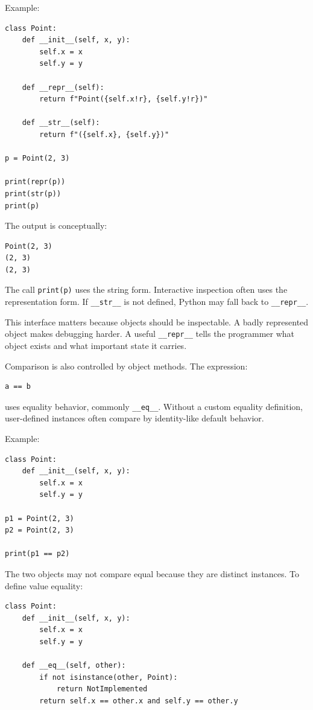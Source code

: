 Example:

\begin{verbatim}
class Point:
    def __init__(self, x, y):
        self.x = x
        self.y = y

    def __repr__(self):
        return f"Point({self.x!r}, {self.y!r})"

    def __str__(self):
        return f"({self.x}, {self.y})"

p = Point(2, 3)

print(repr(p))
print(str(p))
print(p)
\end{verbatim}

The output is conceptually:

\begin{verbatim}
Point(2, 3)
(2, 3)
(2, 3)
\end{verbatim}

The call \texttt{print(p)} uses the string form. Interactive inspection often uses the representation form. If \texttt{\_\_str\_\_} is not defined, Python may fall back to \texttt{\_\_repr\_\_}.

This interface matters because objects should be inspectable. A badly represented object makes debugging harder. A useful \texttt{\_\_repr\_\_} tells the programmer what object exists and what important state it carries.

Comparison is also controlled by object methods. The expression:

\begin{verbatim}
a == b
\end{verbatim}

uses equality behavior, commonly \texttt{\_\_eq\_\_}. Without a custom equality definition, user-defined instances often compare by identity-like default behavior.

Example:

\begin{verbatim}
class Point:
    def __init__(self, x, y):
        self.x = x
        self.y = y

p1 = Point(2, 3)
p2 = Point(2, 3)

print(p1 == p2)
\end{verbatim}

The two objects may not compare equal because they are distinct instances. To define value equality:

\begin{verbatim}
class Point:
    def __init__(self, x, y):
        self.x = x
        self.y = y

    def __eq__(self, other):
        if not isinstance(other, Point):
            return NotImplemented
        return self.x == other.x and self.y == other.y
\end{verbatim}

